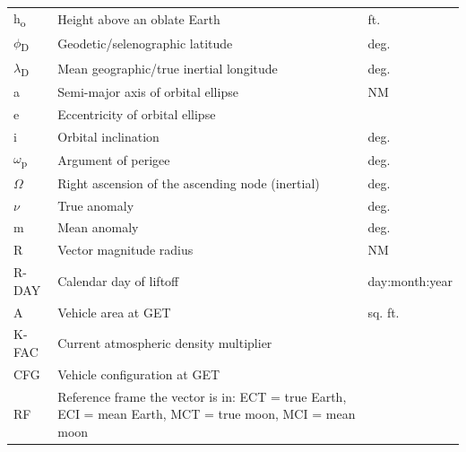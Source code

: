 \documentclass[11pt]{article} %
\begin{document}
\begin{center}
\begin{tabular} { L{2cm} L{8cm} L{6cm} }
h\textsubscript{o}&Height above an oblate Earth&ft.\\
$\phi$\textsubscript{D}&Geodetic/selenographic latitude&deg.\\
$\lambda$\textsubscript{D}&Mean geographic/true inertial longitude&deg.\\
a&Semi-major axis of orbital ellipse&NM\\
e&Eccentricity of orbital ellipse&\\
i&Orbital inclination&deg.\\
$\omega$\textsubscript{p}&Argument of perigee&deg.\\
$\Omega$&Right ascension of the ascending node (inertial)&deg.\\
$\nu$&True anomaly&deg.\\
m&Mean anomaly&deg.\\
R&Vector magnitude radius&NM\\
R-DAY&Calendar day of liftoff&day:month:year\\
A&Vehicle area at GET&sq. ft.\\
K-FAC&Current atmospheric density multiplier\\
CFG&Vehicle configuration at GET&\\
RF&Reference frame the vector is in: ECT = true Earth, ECI = mean Earth, MCT = true moon, MCI = mean moon&\\
\end{tabular}
\end{center}
\newpage
\end{document}
